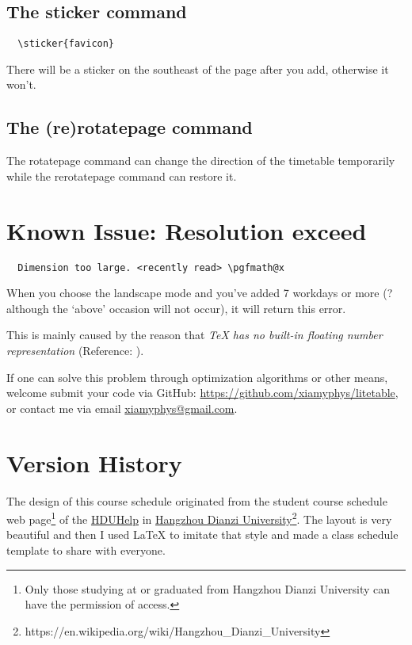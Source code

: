 \documentclass[11pt]{article}
\def\mode#1{\texorpdfstring{\textcolor{moducolor}{\textsf{#1}}}{“#1”}}
\def\cmd#1{\texorpdfstring{\textcolor{cmdcolor}{\textsf{#1}}}{“#1”}}
\begin{document}
\subsection{The \cmd{sticker} command}
\begin{verbatim}
  \sticker{favicon}
\end{verbatim}
There will be a sticker on the southeast of the page after you add, otherwise it won't.

\subsection{The \cmd{(re)rotatepage} command}
The \cmd{rotatepage} command can change the direction of the timetable temporarily while the \cmd{rerotatepage} command can restore it.

\section{Known Issue: Resolution exceed}
\begin{verbatim}
  Dimension too large. <recently read> \pgfmath@x
\end{verbatim}

When you choose the \mode{landscape} mode and you've added 7 workdays or more (?although the `above' occasion will not occur), it will return this error.

This is mainly caused by the reason that \emph{\textsf{\TeX} has no built-in floating number representation} (Reference: ).

If one can solve this problem through optimization algorithms or other means, welcome submit your code via GitHub: \url{https://github.com/xiamyphys/litetable}, or contact me via email \href{mail:xiamyphys@gmail.com}{\ttfamily xiamyphys@gmail.com}.

\section{Version History}

The design of this course schedule originated from the student course schedule web page\footnote{Only those studying at or graduated from Hangzhou Dianzi University can have the permission of access.} of the \href{https://www.hduhelp.cn/}{HDUHelp} in \href{https://www.hdu.edu.cn}{Hangzhou Dianzi University}\footnote{https://en.wikipedia.org/wiki/Hangzhou\_Dianzi\_University}. The layout is very beautiful and then I used \LaTeX{} to imitate that style and made a class schedule template to share with everyone.
\end{document}
